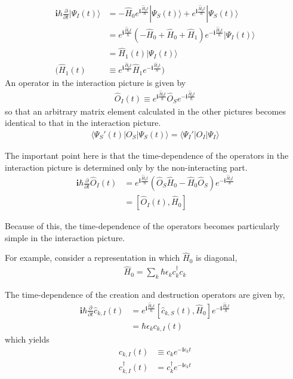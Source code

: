 \begin{align}
\bm{i} \hbar \frac{\partial}{\partial t} |\Psi_I(t)\rangle & =  -\hat H_0 e^{\bm{i}  \frac{\hat H_0t}{\hbar}}|\Psi_S(t)\rangle+e^{\bm{i}  \frac{\hat H_0t}{\hbar}}|\Psi_S(t)\rangle \nonumber \\
& =  e^{\bm{i}  \frac{\hat H_0t}{\hbar}}(-\hat H_0+\hat H_0+\hat H_1)e^{-\bm{i}  \frac{\hat H_0t}{\hbar}} |\Psi_I(t)\rangle \nonumber \\
& =  \hat H_1(t)|\Psi_I(t)\rangle  \\
(\hat H_1(t) &  \equiv e^{\bm{i}  \frac{\hat H_0t}{\hbar}}\hat H_1 e^{-\bm{i}  \frac{\hat H_0t}{\hbar}}  ) \nonumber
\end{align}
 An operator in the interaction picture is given by 
\begin{align}\label{2-1-5}
\hat O_I(t) \equiv e^{\bm{i}  \frac{\hat H_0t}{\hbar}}\hat O_S e^{-\bm{i}  \frac{\hat H_0t}{\hbar}}
\end{align}
so that an arbitrary matrix element calculated in the other pictures becomes identical to that in the interaction picture.
\begin{align}
\langle\Psi_S'(t)|O_S|\Psi_S(t)\rangle=\langle\Psi_I'|O_I|\Psi_I\rangle \nonumber
\end{align}

 The important point here is that the time-dependence of the operators in
the interaction picture is determined only by the non-interacting part.
\begin{align}
\bm{i} \hbar \frac{\partial}{\partial t} \hat O_I(t) &= e^{\bm{i}  \frac{\hat H_0t}{\hbar}}(\hat O_S \hat H_0 - \hat H_0\hat O_S) e^{-\bm{i}  \frac{\hat H_0t}{\hbar}} \nonumber \\
&=[\hat O_I(t), \hat H_0] \nonumber
\end{align}

 Because of this, the time-dependence of the operators becomes particularly simple in the interaction picture.

 For example, consider a representation in which $\hat H_0$ is diagonal,
\begin{align}
\hat H_0= \sum_k \hbar \epsilon_k c_k^{\dagger} c_k \nonumber
\end{align}

 The time-dependence of the creation and destruction operators are given by,
\begin{align}
\bm{i} \hbar \frac{\partial}{\partial t} \hat c_{k,I}(t) &= e^{\bm{i}  \frac{\hat H_0t}{\hbar}}[\hat c_{k,S}(t), \hat H_0] e^{-\bm{i}  \frac{\hat H_0t}{\hbar}} \nonumber \\
&=\hbar \epsilon_k c_{k,I}(t) \nonumber
\end{align}
which yields
\begin{align}
c_{k,I}(t)&\equiv c_k e^{-\bm{i}\epsilon_kt} \nonumber \\
c_{k,I}^{\dagger}(t)&= c^{\dagger}_k e^{-\bm{i}\epsilon_kt} \nonumber
\end{align}

